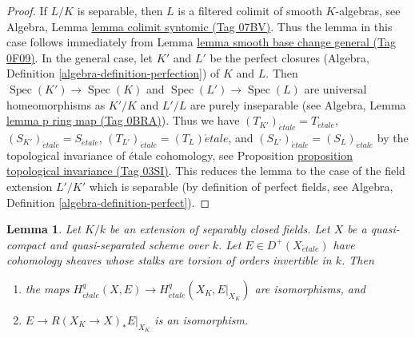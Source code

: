 \documentclass{amsart}
\theoremstyle{plain}
\newtheorem{lemma}[subsection]{Lemma}
\theoremstyle{definition}
\theoremstyle{remark}
\numberwithin{equation}{subsection}
\def\Spec{\mathop{\mathrm{Spec}}}
\def\etale{{\acute{e}tale}}
\begin{document}
\begin{proof}
If $L/K$ is separable, then $L$ is a filtered colimit of smooth
$K$-algebras, see
Algebra, Lemma \href{https://stacks.math.columbia.edu/tag/07BV}{lemma colimit syntomic (Tag 07BV)}.
Thus the lemma in this case follows immediately from
Lemma \href{https://stacks.math.columbia.edu/tag/0F09}{lemma smooth base change general (Tag 0F09)}.
In the general case, let $K'$ and $L'$ be the perfect closures
(Algebra, Definition \ref{algebra-definition-perfection})
of $K$ and $L$. Then $\Spec(K') \to \Spec(K)$ and
$\Spec(L') \to \Spec(L)$ are universal homeomorphisms
as $K'/K$ and $L'/L$ are purely inseparable
(see Algebra, Lemma \href{https://stacks.math.columbia.edu/tag/0BRA}{lemma p ring map (Tag 0BRA)}).
Thus we have $(T_{K'})_\etale = T_\etale$,
$(S_{K'})_\etale = S_\etale$,
$(T_{L'})_\etale = (T_L)\etale$, and
$(S_{L'})_\etale = (S_L)_\etale$ by
the topological invariance of \'etale cohomology, see
Proposition \href{https://stacks.math.columbia.edu/tag/03SI}{proposition topological invariance (Tag 03SI)}.
This reduces the lemma to the case of the field
extension $L'/K'$ which is separable (by definition of
perfect fields, see Algebra, Definition \ref{algebra-definition-perfect}).
\end{proof}


\begin{lemma}
\label{lemma-smooth-base-change-separably-closed}
Let $K/k$ be an extension of separably closed fields. Let $X$
be a quasi-compact and quasi-separated scheme over $k$.
Let $E \in D^+(X_\etale)$ have cohomology sheaves whose stalks
are torsion of orders invertible in $k$. Then
\begin{enumerate}
\item the maps $H^q_\etale(X, E) \to H^q_\etale(X_K, E|_{X_K})$
are isomorphisms, and
\item $E \to R(X_K \to X)_*E|_{X_K}$ is an isomorphism.
\end{enumerate}
\end{lemma}
\end{document}
